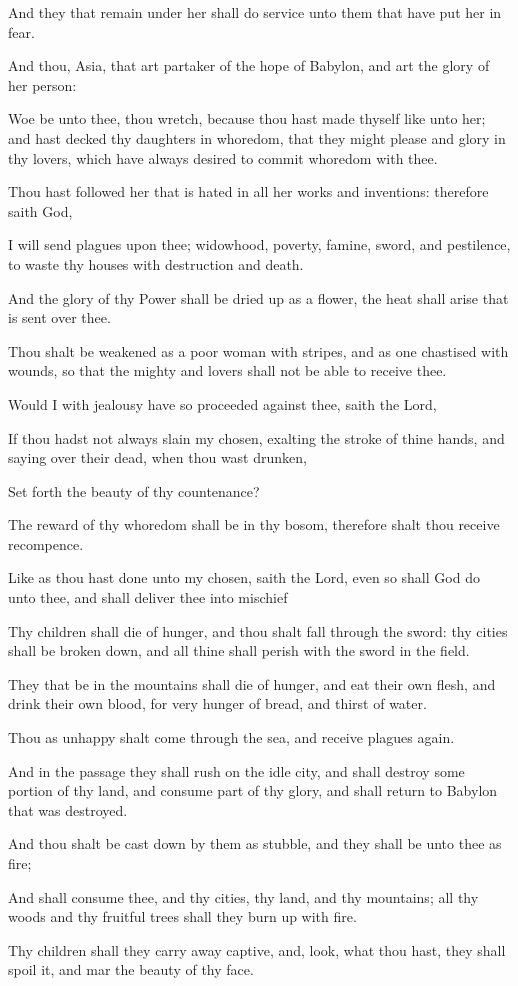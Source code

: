 {\par }{\PP {}And they that remain under her shall do service unto them that have put her in fear.
\par }{\PP {}And thou, Asia, that art partaker of the hope of Babylon, and art the glory of her person:
\par }{\PP {}Woe be unto thee, thou wretch, because thou hast made thyself like unto her; and hast decked thy daughters in whoredom, that they might please and glory in thy lovers, which have always desired to commit whoredom with thee.
\par }{\PP {}Thou hast followed her that is hated in all her works and inventions: therefore saith God,
\par }{\PP {}I will send plagues upon thee; widowhood, poverty, famine, sword, and pestilence, to waste thy houses with destruction and death.
\par }{\PP {}And the glory of thy Power shall be dried up as a flower, the heat shall arise that is sent over thee.
\par }{\PP {}Thou shalt be weakened as a poor woman with stripes, and as one chastised with wounds, so that the mighty and lovers shall not be able to receive thee.
\par }{\PP {}Would I with jealousy have so proceeded against thee, saith the Lord,
\par }{\PP {}If thou hadst not always slain my chosen, exalting the stroke of thine hands, and saying over their dead, when thou wast drunken,
\par }{\PP {}Set forth the beauty of thy countenance?
\par }{\PP {}The reward of thy whoredom shall be in thy bosom, therefore shalt thou receive recompence.
\par }{\PP {}Like as thou hast done unto my chosen, saith the Lord, even so shall God do unto thee, and shall deliver thee into mischief
\par }{\PP {}Thy children shall die of hunger, and thou shalt fall through the sword: thy cities shall be broken down, and all thine shall perish with the sword in the field.
\par }{\PP {}They that be in the mountains shall die of hunger, and eat their own flesh, and drink their own blood, for very hunger of bread, and thirst of water.
\par }{\PP {}Thou as unhappy shalt come through the sea, and receive plagues again.
\par }{\PP {}And in the passage they shall rush on the idle city, and shall destroy some portion of thy land, and consume part of thy glory, and shall return to Babylon that was destroyed.
\par }{\PP {}And thou shalt be cast down by them as stubble, and they shall be unto thee as fire;
\par }{\PP {}And shall consume thee, and thy cities, thy land, and thy mountains; all thy woods and thy fruitful trees shall they burn up with fire.
\par }{\PP {}Thy children shall they carry away captive, and, look, what thou hast, they shall spoil it, and mar the beauty of thy face.

}
